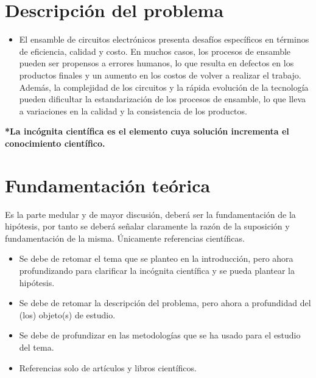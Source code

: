    \section{Descripción del problema}
    \begin{itemize}
        \item El ensamble de circuitos electrónicos presenta desafíos específicos en términos de eficiencia, calidad y costo. En muchos casos, los procesos de ensamble pueden ser propensos a errores humanos, lo que resulta en defectos en los productos finales y un aumento en los costos de volver a realizar el trabajo. Además, la complejidad de los circuitos y la rápida evolución de la tecnología pueden dificultar la estandarización de los procesos de ensamble, lo que lleva a variaciones en la calidad y la consistencia de los productos.
    
    \end{itemize}
    
    \textbf{*La incógnita científica es el elemento cuya solución incrementa el conocimiento
    científico.}
    \section{Fundamentación teórica}
    
    Es la parte medular y de mayor discusión, deberá ser la fundamentación de la hipótesis, por tanto se deberá señalar claramente la razón de la suposición y fundamentación de la misma. Únicamente referencias científicas.
    \begin{itemize}
        \item Se debe de retomar el tema que se planteo en la introducción, pero ahora profundizando para clarificar la incógnita científica y se pueda plantear la hipótesis.
        \item Se debe de retomar la descripción del problema, pero ahora a profundidad del (los) objeto(s) de estudio. 
        \item Se debe de profundizar en las metodologías que se ha usado para el estudio del tema.
        \item Referencias solo de artículos y libros científicos.
    \end{itemize}

